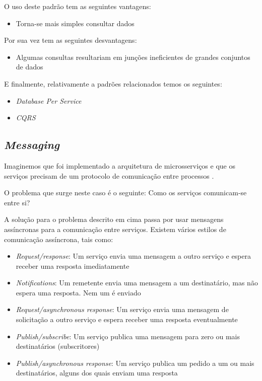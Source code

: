 O uso deste padrão tem as seguintes vantagens:
\begin{itemize}
    \item Torna-se mais simples consultar dados \cite{apiCompositionPattern}
\end{itemize}

Por sua vez tem as seguintes desvantagens:
\begin{itemize}
    \item Algumas consultas resultariam em junções ineficientes de grandes conjuntos de dados \cite{apiCompositionPattern}
\end{itemize}

E finalmente, relativamente a padrões relacionados temos os seguintes:
\begin{itemize}
    \item \textit{Database Per Service}
    \item \textit{CQRS}
\end{itemize}

\subsection{\textit{Messaging}}

Imaginemos que foi implementado a arquitetura de microsserviços e que os serviços precisam de um protocolo de comunicação entre processos \cite{messagingPattern}. 

O problema que surge neste caso é o seguinte: Como os serviços comunicam-se entre si? \cite{messagingPattern}

A solução para o problema descrito em cima passa por usar mensagens assíncronas para a comunicação entre serviços. Existem vários estilos de comunicação assíncrona, tais como:

\begin{itemize}
    \item \textit{Request/response}: Um serviço envia uma mensagem a outro serviço e espera receber uma resposta imediatamente \cite{messagingPattern}
    \item \textit{Notifications}: Um remetente envia uma mensagem a um destinatário, mas não espera uma resposta. Nem um é enviado \cite{messagingPattern}
    \item \textit{Request/asynchronous response}: Um serviço envia uma mensagem de solicitação a outro serviço e espera receber uma resposta eventualmente \cite{messagingPattern}
    \item \textit{Publish/subscribe}: Um serviço publica uma mensagem para zero ou mais destinatários (subscritores) \cite{messagingPattern}
    \item \textit{Publish/asynchronous response}: Um serviço publica um pedido a um ou mais destinatários, alguns dos quais enviam uma resposta \cite{messagingPattern}
\end{itemize}

